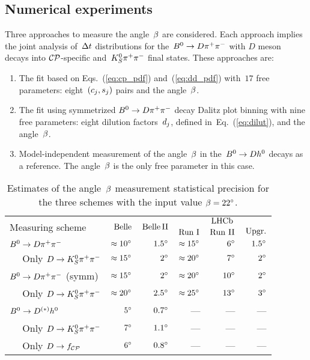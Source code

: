 \documentclass[a4paper,11pt]{article}
\begin{document}
\subsection{Numerical experiments}\label{sec:toymc}
Three approaches to measure the angle~$\beta$ are considered.  
Each approach implies the joint analysis of~$\Delta t$ distributions 
for the~$B^0\to D\pi^+\pi^-$ with $D$ meson decays into $\mathcal{CP}$-specific 
and~$K_S^0\pi^+\pi^-$ final states.  These approaches are:
\begin{enumerate}
 \item The fit based on Eqs.~(\ref{eq:cp_pdf}) and~(\ref{eq:dd_pdf}) 
 with~$17$ free parameters: eight~$\left( c_j, s_j\right)$ pairs and the 
 angle~$\beta$.
 \item The fit using symmetrized $B^0\to D\pi^+\pi^-$ decay Dalitz plot binning with 
 nine free parameters: eight dilution factors~$d_j$, defined 
 in~Eq.~(\ref{eq:dilut}), and the angle~$\beta$.
 \item Model-independent measurement of the angle~$\beta$ 
 in the~$B^0\to D h^0$ decays as a reference.  The angle~$\beta$ is the only free 
 parameter in this case.
\end{enumerate}

\begin{table}
\centering
\caption{Estimates of the angle~$\beta$ measurement statistical precision for 
the three schemes with the input value $\beta=22{}^{\circ}$.
}
\label{tab:precision}
\begin{tabular}{lrrrrr}
 \hline\hline
 \multirow{2}{*}{Measuring scheme} &
 \multirow{2}{*}{$\mathrm{Belle}$}  & 
 \multirow{2}{*}{$\mathrm{Belle}\,\mathrm{II}$} &
 \multicolumn{3}{c}{$\mathrm{LHCb}$} \\
                                  &           &            & $\mathrm{Run\ I}$   & $\mathrm{Run\ II}$ & $\mathrm{Upgr.}$ \\
 \hline
 $B^0\to D\pi^+\pi^-$                          & $\approx10{}^{\circ}$ & $1.5{}^{\circ}$ & $\approx15{}^{\circ}$ & $ 6{}^{\circ}$ & $1.5{}^{\circ}$ \\
 $\quad$ Only $D\to K_S^0\pi^+\pi^-$             & $\approx15{}^{\circ}$ & $2  {}^{\circ}$ & $\approx20{}^{\circ}$ & $ 7{}^{\circ}$ & $2  {}^{\circ}$ \\
 \hline
 $B^0\to D\pi^+\pi^-$ (symm)                   & $\approx15{}^{\circ}$ & $2  {}^{\circ}$ & $\approx20{}^{\circ}$ & $10{}^{\circ}$ & $2  {}^{\circ}$ \\
 $\quad$ Only $D\to K_S^0\pi^+\pi^-$             & $\approx20{}^{\circ}$ & $2.5{}^{\circ}$ & $\approx25{}^{\circ}$ & $13{}^{\circ}$ & $3  {}^{\circ}$ \\
 \hline
 $B^0\to D{}^{(*)}h^0$                         & $ 5{}^{\circ}$ & $0.7{}^{\circ}$ & --- & --- & --- \\
 $\quad$ Only $D\to K_S^0\pi^+\pi^-$             & $ 7{}^{\circ}$ & $1.1{}^{\circ}$ & --- & --- & --- \\
 $\quad$ Only $D\to f_{\mathcal{CP}}$  & $ 6{}^{\circ}$ & $0.8{}^{\circ}$ & --- & --- & --- \\
 \hline\hline
 \end{tabular}
\end{table}
\end{document}
